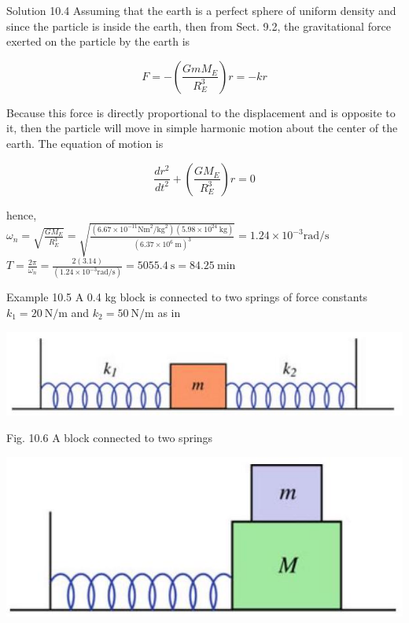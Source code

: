 \documentclass[10pt]{article}
\begin{document}
Solution 10.4 Assuming that the earth is a perfect sphere of uniform density and since the particle is inside the earth, then from Sect. 9.2, the gravitational force exerted on the particle by the earth is

$$
F=-\left(\frac{G m M_{E}}{R_{E}^{3}}\right) r=-k r
$$

Because this force is directly proportional to the displacement and is opposite to it, then the particle will move in simple harmonic motion about the center of the earth. The equation of motion is

$$
\frac{d r^{2}}{d t^{2}}+\left(\frac{G M_{E}}{R_{E}^{3}}\right) r=0
$$

hence,\\
$\omega_{n}=\sqrt{\frac{G M_{E}}{R_{E}^{3}}}=\sqrt{\frac{\left(6.67 \times 10^{-11} \mathrm{Nm}^{2} / \mathrm{kg}^{2}\right)\left(5.98 \times 10^{24} \mathrm{~kg}\right)}{\left(6.37 \times 10^{6} \mathrm{~m}\right)^{3}}}=1.24 \times 10^{-3} \mathrm{rad} / \mathrm{s}$\\
$T=\frac{2 \pi}{\omega_{n}}=\frac{2(3.14)}{\left(1.24 \times 10^{-3} \mathrm{rad} / \mathrm{s}\right)}=5055.4 \mathrm{~s}=84.25 \mathrm{~min}$

Example 10.5 A 0.4 kg block is connected to two springs of force constants $k_{1}=20 \mathrm{~N} / \mathrm{m}$ and $k_{2}=50 \mathrm{~N} / \mathrm{m}$ as in

\begin{center}
\includegraphics[max width=\textwidth]{2024_09_13_db1f357d2aad0a03eb2eg-166}
\end{center}

Fig. 10.6 A block connected to two springs

\begin{center}
\includegraphics[max width=\textwidth]{2024_09_13_db1f357d2aad0a03eb2eg-166(2)}
\end{center}
\end{document}

